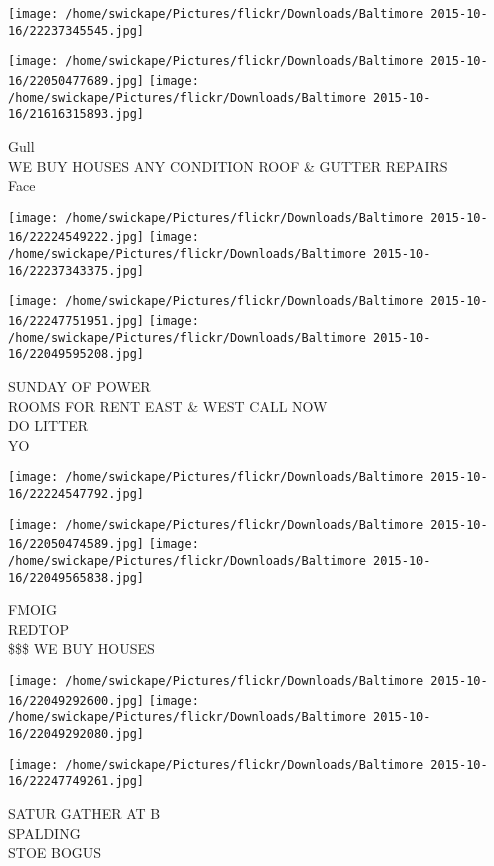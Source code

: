 \documentclass[10pt,letterpaper]{article}
\begin{document}
\texttt{[image: /home/swickape/Pictures/flickr/Downloads/Baltimore 2015-10-16/22237345545.jpg]}

\vspace{0.25in}
\texttt{[image: /home/swickape/Pictures/flickr/Downloads/Baltimore 2015-10-16/22050477689.jpg]}
\texttt{[image: /home/swickape/Pictures/flickr/Downloads/Baltimore 2015-10-16/21616315893.jpg]}

Gull\\
WE BUY HOUSES ANY CONDITION ROOF \& GUTTER REPAIRS\\
Face
\pagebreak

\texttt{[image: /home/swickape/Pictures/flickr/Downloads/Baltimore 2015-10-16/22224549222.jpg]}
\texttt{[image: /home/swickape/Pictures/flickr/Downloads/Baltimore 2015-10-16/22237343375.jpg]}

\texttt{[image: /home/swickape/Pictures/flickr/Downloads/Baltimore 2015-10-16/22247751951.jpg]}
\texttt{[image: /home/swickape/Pictures/flickr/Downloads/Baltimore 2015-10-16/22049595208.jpg]}

SUNDAY OF POWER\\
ROOMS FOR RENT EAST \& WEST CALL NOW\\
DO LITTER\\
YO
\pagebreak

\texttt{[image: /home/swickape/Pictures/flickr/Downloads/Baltimore 2015-10-16/22224547792.jpg]}

\vspace{0.25in}
\texttt{[image: /home/swickape/Pictures/flickr/Downloads/Baltimore 2015-10-16/22050474589.jpg]}
\texttt{[image: /home/swickape/Pictures/flickr/Downloads/Baltimore 2015-10-16/22049565838.jpg]}

FMOIG\\
REDTOP\\
\$\$\$ WE BUY HOUSES
\pagebreak

\texttt{[image: /home/swickape/Pictures/flickr/Downloads/Baltimore 2015-10-16/22049292600.jpg]}
\texttt{[image: /home/swickape/Pictures/flickr/Downloads/Baltimore 2015-10-16/22049292080.jpg]}

\vspace{0.25in}
\texttt{[image: /home/swickape/Pictures/flickr/Downloads/Baltimore 2015-10-16/22247749261.jpg]}

SATUR GATHER AT B\\
SPALDING\\
STOE BOGUS
\pagebreak
\end{document}
